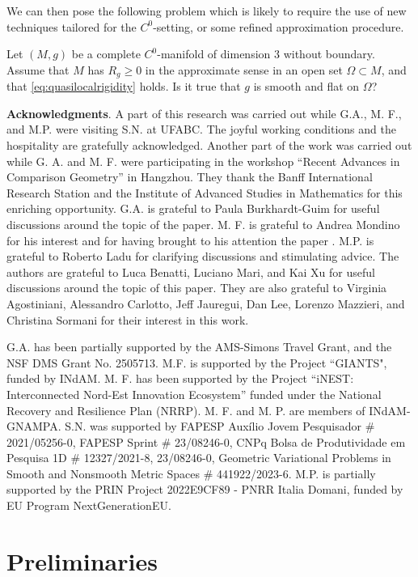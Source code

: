 \documentclass[a4paper,12pt,reqno]{amsart}
\numberwithin{equation}{section}
\theoremstyle{plain}
\theoremstyle{definition}
\theoremstyle{remark}
\begin{document}
{We can then pose the following problem
which is likely to require the use of new techniques tailored for the $C^0$-setting, or some refined approximation procedure.

\begin{question}\label{prob:Rigidity}
Let $(M, g)$ be a complete $C^0$-manifold of dimension $3$ without boundary. Assume that $M$ has $R_g\geq 0$ in the approximate sense  in an open set $\Omega \subset M$, and that \eqref{eq:quasilocalrigidity} holds. Is it true that $g$ is smooth and flat on $\Omega$?
\end{question}
\medskip
\medskip

\textbf{Acknowledgments}. A part of this research was carried out while G.A., M. F., and M.P. were visiting S.N. at UFABC. The joyful working conditions and the hospitality are gratefully acknowledged. Another part of the work was carried out while G. A. and M. F. were participating in the workshop ``Recent Advances in Comparison Geometry'' in Hangzhou. They thank the Banff International Research Station and the Institute of Advanced Studies in Mathematics for this enriching opportunity. G.A. is grateful to Paula Burkhardt-Guim for useful discussions around the topic of the paper.
M. F. is grateful to Andrea Mondino for his interest and for having brought to his attention the paper \cite{t.browne-mondino}.
M.P. is grateful to Roberto Ladu for clarifying discussions and stimulating advice. The authors are grateful to Luca Benatti, Luciano Mari, and Kai Xu for useful discussions around the topic of this paper. They are also grateful to Virginia Agostiniani, Alessandro Carlotto, Jeff Jauregui, Dan Lee, Lorenzo Mazzieri, and Christina Sormani for their interest in this work.

G.A. has been partially supported by the AMS-Simons Travel Grant, and the NSF DMS Grant No. 2505713.
M.F. is supported by the Project ``GIANTS", funded by INdAM.
M. F. has been supported by the Project ``iNEST: Interconnected Nord-Est Innovation Ecosystem'' funded under the National Recovery and Resilience Plan (NRRP). M. F. and M. P. are members of INdAM-GNAMPA. S.N. was supported by FAPESP Auxílio Jovem Pesquisador \# 2021/05256-0, FAPESP Sprint 	\# 23/08246-0, CNPq  Bolsa de Produtividade em Pesquisa 1D \# 12327/2021-8, 23/08246-0, Geometric Variational Problems in Smooth and Nonsmooth Metric Spaces \# 441922/2023-6. M.P. is partially supported by the PRIN Project 2022E9CF89 - PNRR Italia Domani, funded by EU Program NextGenerationEU.


\section{Preliminaries}

}
\end{document}
